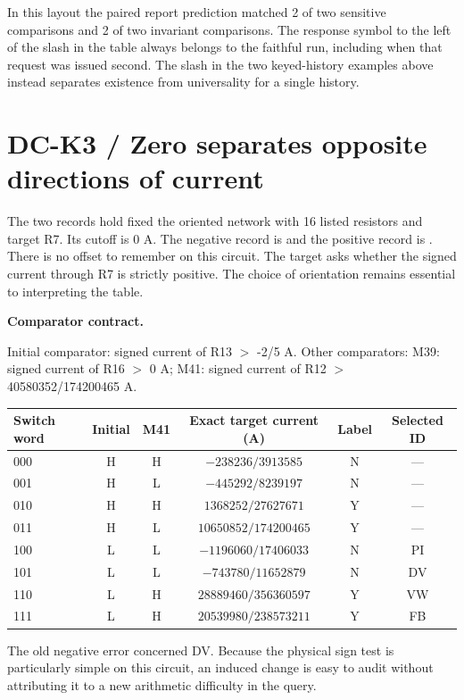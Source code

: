 \documentclass[12pt,letterpaper]{article}
\newcommand{\code}[1]{\texttt{\detokenize{#1}}}
\newcommand{\reading}[2]{\par\smallskip\textsf{\color{accent}\bfseries #1}\enspace #2\par}
\begin{document}
In this layout the paired report prediction matched 2 of two sensitive comparisons and 2 of two invariant comparisons. The response symbol to the left of the slash in the table always belongs to the faithful run, including when that request was issued second. The slash in the two keyed-history examples above instead separates existence from universality for a single history.

\clearpage\section{DC-K3 / Zero separates opposite directions of current}

The two records hold fixed the oriented network with 16 listed resistors and target R7. Its cutoff is $0$ A. The negative record is \code{scope-10} and the positive record is \code{scope-11}. There is no offset to remember on this circuit. The target asks whether the signed current through R7 is strictly positive. The choice of orientation remains essential to interpreting the table.

\reading{Comparator contract.}{} Initial comparator: signed current of R13 $>$ -2/5 A. Other comparators: M39: signed current of R16 $>$ 0 A; M41: signed current of R12 $>$ 40580352/174200465 A.

\begin{center}\small\begin{tabular}{@{}lccccc@{}}\toprule
Switch word & Initial & M41 & Exact target current (A) & Label & Selected ID\\\midrule
000 & H & H & $-238236/3913585$ & N & ---\\
001 & H & L & $-445292/8239197$ & N & ---\\
010 & H & H & $1368252/27627671$ & Y & ---\\
011 & H & L & $10650852/174200465$ & Y & ---\\
100 & L & L & $-1196060/17406033$ & N & PI\\
101 & L & L & $-743780/11652879$ & N & DV\\
110 & L & H & $28889460/356360597$ & Y & VW\\
111 & L & H & $20539980/238573211$ & Y & FB\\\bottomrule\end{tabular}\end{center}

The old negative error concerned DV. Because the physical sign test is particularly simple on this circuit, an induced change is easy to audit without attributing it to a new arithmetic difficulty in the query.
\end{document}
